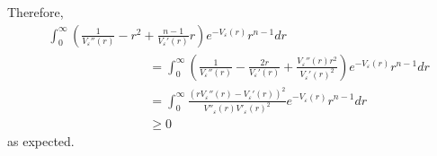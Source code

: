\documentclass[11pt]{article}
\newtheorem{lemma}[conjecture]{Lemma}
\newcommand{\1}{[1]}
\begin{document}
Therefore,
\begin{align*}
 & \int_0^\infty \left(\frac{1}{V_\varepsilon''(r)} -r^2 + \frac{n-1}{V_\varepsilon'(r)}r \right)  e^{-V_\varepsilon(r)}r^{n-1}dr \\
  & \qquad \qquad \qquad\qquad=
  \int_0^\infty \left(\frac{1}{V_\varepsilon''(r)} -\frac{2r}{V_\varepsilon'(r)} + \frac{V_\varepsilon''(r)r^2}{V_\varepsilon'(r)^2} \right) e^{-V_\varepsilon(r)}r^{n-1}dr \\
  &  \qquad \qquad \qquad\qquad=
  \int_0^\infty \frac{(rV_\varepsilon''(r)-V_\varepsilon'(r))^2}{V''_\varepsilon(r)V'_\varepsilon(r)^2} e^{-V_\varepsilon(r)}r^{n-1}dr \\
  & \qquad \qquad \qquad\qquad 
  \geq 0
\end{align*}
as expected. 
















\end{document}
